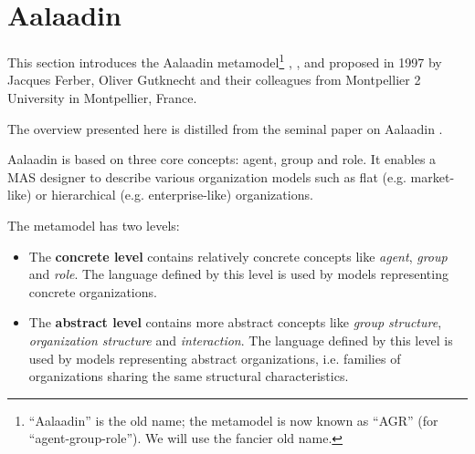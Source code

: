 
\section{Aalaadin}

This section introduces the Aalaadin metamodel\footnote{``Aalaadin'' is the old name; the metamodel is now known as ``AGR'' (for ``agent-group-role''). We will use the fancier old name.} \cite{Ferber97}, \cite{Ferber98}, \cite{Ferber00} and \cite{Ferber03} proposed in 1997 by Jacques Ferber, Oliver Gutknecht and their colleagues from Montpellier 2 University in Montpellier, France.

The overview presented here is distilled from the seminal paper on Aalaadin \cite{Ferber97}.


Aalaadin is based on three core concepts: agent, group and role.
It enables a MAS designer to describe various organization models such as flat (e.g. market-like) or hierarchical (e.g. enterprise-like) organizations.

The metamodel has two levels:
\begin{itemize}
	\item The \textbf{concrete level} contains relatively concrete concepts like \textit{agent}, \textit{group} and \textit{role}.
	The language defined by this level is used by models representing concrete organizations.
	\item The \textbf{abstract level} contains more abstract concepts like \textit{group structure}, \textit{organization structure} and \textit{interaction}. 
	The language defined by this level is used by models representing abstract organizations, i.e. families of organizations sharing the same structural characteristics.
\end{itemize}

